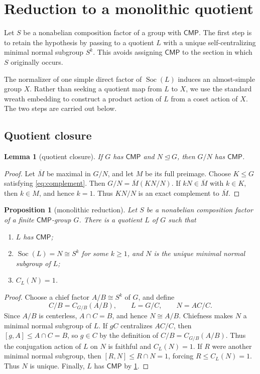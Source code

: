\documentclass[11pt]{amsart}
\newcommand{\CMP}{\mathsf{CMP}}
\newcommand{\Soc}{\operatorname{Soc}}
\newtheorem{proposition}[theorem]{Proposition}
\newtheorem{lemma}[theorem]{Lemma}
\theoremstyle{definition}
\begin{document}
\section{Reduction to a monolithic quotient}\label{sec:lifting}

Let \(S\) be a nonabelian composition factor of a group with \(\CMP\).  The
first step is to retain the hypothesis by passing to a quotient \(L\) with a
unique self-centralizing minimal normal subgroup \(S^k\).  This avoids
assigning \(\CMP\) to the section in which \(S\) originally occurs.

The normalizer of one simple direct factor of \(\Soc(L)\) induces an
almost-simple group \(X\).  Rather than seeking a quotient map from \(L\) to
\(X\), we use the standard wreath embedding to construct a product action of
\(L\) from a coset action of \(X\).  The two steps are carried out below.

\subsection{Quotient closure}

\begin{lemma}[quotient closure]\label{lem:quotient}
If \(G\) has \(\CMP\) and \(N\trianglelefteq G\), then \(G/N\) has \(\CMP\).
\end{lemma}

\begin{proof}
Let \(\overline M\) be maximal in \(G/N\), and let \(M\) be its full
preimage.  Choose \(K\leq G\) satisfying \eqref{eq:complement}.  Then
\(G/N=\overline M(KN/N)\).  If \(kN\in\overline M\) with \(k\in K\), then
\(k\in M\), and hence \(k=1\).  Thus \(KN/N\) is an exact complement to
\(\overline M\).
\end{proof}

\begin{proposition}[monolithic reduction]\label{prop:monolithic}
Let \(S\) be a nonabelian composition factor of a finite \(\CMP\)-group
\(G\).  There is a quotient \(L\) of \(G\) such that
\begin{enumerate}
\item \(L\) has \(\CMP\);
\item \(\Soc(L)=N\cong S^k\) for some \(k\geq1\), and \(N\) is the unique
minimal normal subgroup of \(L\);
\item \(C_L(N)=1\).
\end{enumerate}
\end{proposition}

\begin{proof}
Choose a chief factor \(A/B\cong S^k\) of \(G\), and define
\[
C/B=C_{G/B}(A/B),\qquad L=G/C,\qquad N=AC/C.
\]
Since \(A/B\) is centerless, \(A\cap C=B\), and hence \(N\cong A/B\).
Chiefness makes \(N\) a minimal normal subgroup of \(L\).  If \(gC\)
centralizes \(AC/C\), then \([g,A]\leq A\cap C=B\), so \(g\in C\) by the
definition of \(C/B=C_{G/B}(A/B)\).  Thus the conjugation action of \(L\) on
\(N\) is faithful and \(C_L(N)=1\).  If \(R\) were another minimal normal subgroup, then
\([R,N]\leq R\cap N=1\), forcing \(R\leq C_L(N)=1\).  Thus \(N\) is unique.
Finally, \(L\) has \(\CMP\) by \cref{lem:quotient}.
\end{proof}
\end{document}
